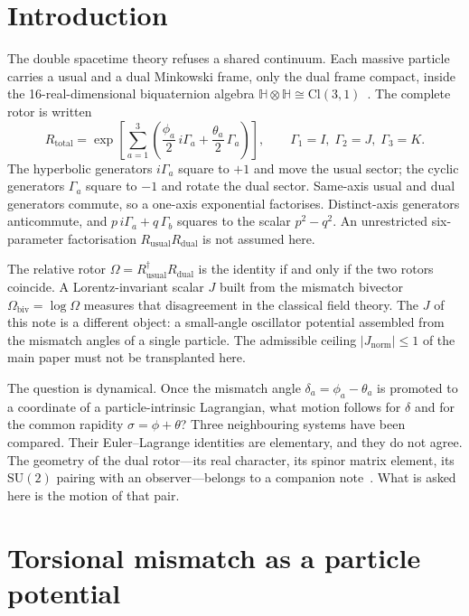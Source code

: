 \documentclass[a4paper]{article}
\begin{document}
\section{Introduction}

The double spacetime theory refuses a shared continuum. Each massive particle carries a usual and a dual Minkowski frame, only the dual frame compact, inside the 16-real-dimensional biquaternion algebra \(\mathbb{H}\otimes\mathbb{H}\cong\mathrm{Cl}(3,1)\)~\cite{dst-main}. The complete rotor is written
\[
R_{\mathrm{total}}
  =\exp\!\left[\sum_{a=1}^3\left(\frac{\phi_a}{2}\,i\Gamma_a+\frac{\theta_a}{2}\,\Gamma_a\right)\right],
\qquad
\Gamma_1=I,\;\Gamma_2=J,\;\Gamma_3=K.
\]
The hyperbolic generators \(i\Gamma_a\) square to \(+1\) and move the usual sector; the cyclic generators \(\Gamma_a\) square to \(-1\) and rotate the dual sector. Same-axis usual and dual generators commute, so a one-axis exponential factorises. Distinct-axis generators anticommute, and \(p\,i\Gamma_a+q\,\Gamma_b\) squares to the scalar \(p^2-q^2\). An unrestricted six-parameter factorisation \(R_{\mathrm{usual}}R_{\mathrm{dual}}\) is not assumed here.

The relative rotor \(\Omega=R_{\mathrm{usual}}^\dagger R_{\mathrm{dual}}\) is the identity if and only if the two rotors coincide. A Lorentz-invariant scalar \(J\) built from the mismatch bivector \(\Omega_{\mathrm{biv}}=\log\Omega\) measures that disagreement in the classical field theory. The \(J\) of this note is a different object: a small-angle oscillator potential assembled from the mismatch angles of a single particle. The admissible ceiling \(\lvert J_{\mathrm{norm}}\rvert\le 1\) of the main paper must not be transplanted here.

The question is dynamical. Once the mismatch angle \(\delta_a=\phi_a-\theta_a\) is promoted to a coordinate of a particle-intrinsic Lagrangian, what motion follows for \(\delta\) and for the common rapidity \(\sigma=\phi+\theta\)? Three neighbouring systems have been compared. Their Euler--Lagrange identities are elementary, and they do not agree. The geometry of the dual rotor---its real character, its spinor matrix element, its \(\mathrm{SU}(2)\) pairing with an observer---belongs to a companion note~\cite{dst-de-broglie-wave}. What is asked here is the motion of that pair.

\section{Torsional mismatch as a particle potential}
\end{document}
